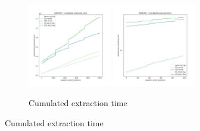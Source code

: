 \begin{figure}
    \centering
    \begin{subfigure}[b]{\textwidth}
        \centering
        \includegraphics[width=0.40\textwidth]{./fragments/04_experimental_execution/images/02_basebenchmark_01_base_benchmark.png.0_0.png}
        \includegraphics[width=0.40\textwidth]{./fragments/04_experimental_execution/images/02_basebenchmark_01_base_benchmark.png.0_1.png}
        \caption{Cumulated extraction time}
        \label{FIG:PARTITION_SCHEME_01_SHUFFLED__0_0}
    \end{subfigure}


\end{figure}
